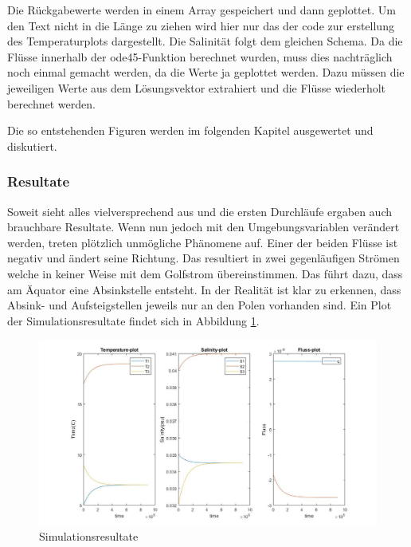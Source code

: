 
\label{thermohalin:listing:solve}

Die Rückgabewerte werden in einem Array gespeichert und dann geplottet. Um den Text nicht in die Länge zu ziehen wird hier nur das der code zur erstellung des Temperaturplots dargestellt. Die Salinität folgt dem gleichen Schema.
Da die Flüsse innerhalb der ode45-Funktion berechnet wurden, muss dies nachträglich noch einmal gemacht werden, da die Werte ja geplottet werden. Dazu müssen die jeweiligen Werte aus dem Lösungsvektor extrahiert und die Flüsse wiederholt berechnet werden.
\label{thermohalin:listing:plot}

Die so entstehenden Figuren werden im folgenden Kapitel ausgewertet und diskutiert. 

\subsubsection{Resultate}


Soweit sieht alles vielversprechend aus und die ersten Durchläufe ergaben auch brauchbare Resultate. Wenn nun jedoch mit den Umgebungsvariablen verändert werden, treten plötzlich unmögliche Phänomene auf.
Einer der beiden Flüsse ist negativ und ändert seine Richtung. Das resultiert in zwei gegenläufigen Strömen welche in keiner Weise mit dem Golfstrom übereinstimmen. Das führt dazu, dass am Äquator eine Absinkstelle entsteht. In der Realität ist klar zu erkennen, dass Absink- und Aufsteigstellen jeweils nur an den Polen vorhanden sind. 
Ein Plot der Simulationsresultate findet sich in Abbildung \ref{thermohalin:simulationsresultate}.

\begin{figure}
	\includegraphics[width=14cm]{thermohalin/Code/graphs/result-3b2f-script.jpg}
	\centering
	\caption{Simulationsresultate}
	\label{thermohalin:simulationsresultate}
\end{figure}

